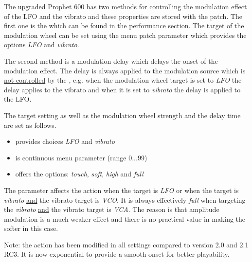 The upgraded Prophet 600 has two methods for controlling the modulation effect of the LFO and the vibrato and these properties are  stored with the patch. The first one is the \modwheel which can be found in the performance section. The target of the modulation wheel can be set using the menu patch parameter \modwheeltarget which provides the options \textit{LFO} and \textit{vibrato}. 

The second method is a modulation delay which delays the onset of the modulation effect. The delay is always applied to the modulation source which is \underline{not controlled} by the \modwheel, e.g. when the modulation wheel target is set to \textit{LFO} the delay applies to the vibrato and when it is set to \textit{vibrato} the delay is applied to the LFO.

The target setting as well as the modulation wheel strength and the delay time are set as follows. 
\begin{itemize}
  \item \modwheeltarget provides choices \textit{LFO} and \textit{vibrato}
  \item \moddelay is continuous menu parameter (range 0...99)
  \item \modwheelrange offers the options: \textit{touch}, \textit{soft}, \textit{high} and \textit{full}
\end{itemize} 

The parameter \modwheelrange affects the \modwheel action when the target is \textit{LFO} or when the target is \textit{vibrato} \underline{and} the vibrato target is \textit{VCO}. It is always effectively \textit{full} when  targeting the \textit{vibrato} \underline{and} the vibrato target is \textit{VCA}. The reason is that amplitude modulation is a much weaker effect and there is no practical value in making the \modwheel softer in this case.

Note: the \modwheel action has been modified in all settings compared to version 2.0 and 2.1 RC3. It is now exponential to provide a smooth onset for better playability.
